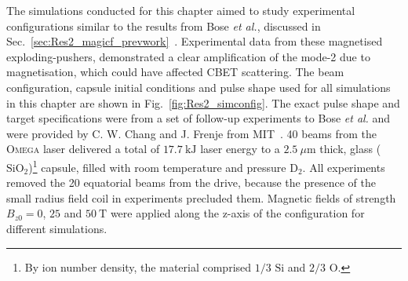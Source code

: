 The simulations conducted for this chapter aimed to study experimental configurations similar to the results from Bose \textit{et al.}, discussed in Sec.~\ref{sec:Res2_magicf_prevwork}~\cite{bose_effect_2022}.
Experimental data from these magnetised exploding-pushers, demonstrated a clear amplification of the mode-2 due to magnetisation, which could have affected \ac{CBET} scattering.
The beam configuration, capsule initial conditions and pulse shape used for all simulations in this chapter are shown in Fig.~\ref{fig:Res2_simconfig}.
The exact pulse shape and target specifications were from a set of follow-up experiments to Bose \textit{et al.} and were provided by C. W. Chang and J. Frenje from \ac{MIT}~\cite{chang__2023}.
40 beams from the \textsc{Omega} laser delivered a total of $17.7\ \text{kJ}$ laser energy to a $2.5\ \mu\text{m}$ thick, glass ($\text{SiO}_2$)\footnote{By ion number density, the material comprised $1/3$ $\text{Si}$ and $2/3$ $\text{O}$.} capsule, filled with room temperature and pressure $\text{D}_2$.
All experiments removed the 20 equatorial beams from the drive, because the presence of the small radius field coil in experiments precluded them.
Magnetic fields of strength $B_{z0}=0$, $25$ and $50\ \text{T}$ were applied along the z-axis of the configuration for different simulations.

